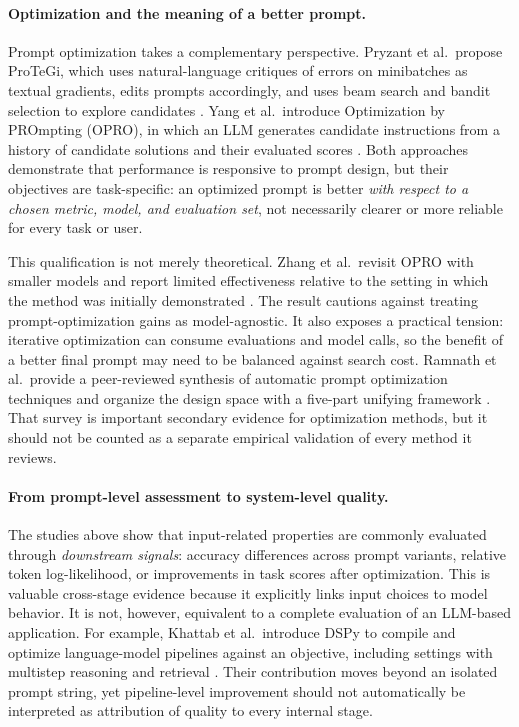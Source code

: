\paragraph{Optimization and the meaning of a better prompt.}
Prompt optimization takes a complementary perspective. Pryzant et al.\ propose ProTeGi, which uses natural-language critiques of errors on minibatches as textual gradients, edits prompts accordingly, and uses beam search and bandit selection to explore candidates \cite{pryzant2023protegi}. Yang et al.\ introduce Optimization by PROmpting (OPRO), in which an LLM generates candidate instructions from a history of candidate solutions and their evaluated scores \cite{yang2024opro}. Both approaches demonstrate that performance is responsive to prompt design, but their objectives are task-specific: an optimized prompt is better \emph{with respect to a chosen metric, model, and evaluation set}, not necessarily clearer or more reliable for every task or user.

This qualification is not merely theoretical. Zhang et al.\ revisit OPRO with smaller models and report limited effectiveness relative to the setting in which the method was initially demonstrated \cite{zhang2024revisitingopro}. The result cautions against treating prompt-optimization gains as model-agnostic. It also exposes a practical tension: iterative optimization can consume evaluations and model calls, so the benefit of a better final prompt may need to be balanced against search cost. Ramnath et al.\ provide a peer-reviewed synthesis of automatic prompt optimization techniques and organize the design space with a five-part unifying framework \cite{ramnath2025aposurvey}. That survey is important secondary evidence for optimization methods, but it should not be counted as a separate empirical validation of every method it reviews.

\paragraph{From prompt-level assessment to system-level quality.}
The studies above show that input-related properties are commonly evaluated through \emph{downstream signals}: accuracy differences across prompt variants, relative token log-likelihood, or improvements in task scores after optimization. This is valuable cross-stage evidence because it explicitly links input choices to model behavior. It is not, however, equivalent to a complete evaluation of an LLM-based application. For example, Khattab et al.\ introduce DSPy to compile and optimize language-model pipelines against an objective, including settings with multistep reasoning and retrieval \cite{khattab2024dspy}. Their contribution moves beyond an isolated prompt string, yet pipeline-level improvement should not automatically be interpreted as attribution of quality to every internal stage.


